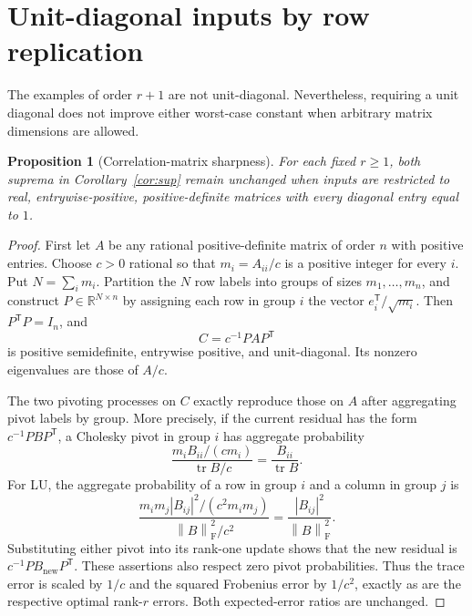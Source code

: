 \documentclass[11pt]{article}
\newtheorem{proposition}[theorem]{Proposition}
\theoremstyle{remark}
\DeclareMathOperator{\tr}{tr}
\newcommand{\R}{\mathbb R}
\newcommand{\F}{\mathrm F}
\newcommand{\norm}[1]{\left\lVert#1\right\rVert}
\begin{document}
\section{Unit-diagonal inputs by row replication}

The examples of order $r+1$ are not unit-diagonal. Nevertheless, requiring a
unit diagonal does not improve either worst-case constant when arbitrary
matrix dimensions are allowed.

\begin{proposition}[Correlation-matrix sharpness]\label{prop:correlation}
For each fixed $r\ge1$, both suprema in Corollary~\ref{cor:sup} remain unchanged
when inputs are restricted to real, entrywise-positive, positive-definite
matrices with every diagonal entry equal to $1$.
\end{proposition}
\begin{proof}
First let $A$ be any rational positive-definite matrix of order $n$ with
positive entries. Choose $c>0$ rational so that
$m_i=A_{ii}/c$ is a positive integer for every $i$. Put $N=\sum_i m_i$.
Partition the $N$ row labels into groups of sizes $m_1,\ldots,m_n$, and
construct $P\in\R^{N\times n}$ by assigning each row in group $i$ the vector
$e_i^{\mathsf T}/\sqrt{m_i}$. Then $P^{\mathsf T}P=I_n$, and
\[
 C=c^{-1}PAP^{\mathsf T}
\]
is positive semidefinite, entrywise positive, and unit-diagonal. Its nonzero
eigenvalues are those of $A/c$.

The two pivoting processes on $C$ exactly reproduce those on $A$ after
aggregating pivot labels by group. More precisely, if the current residual
has the form $c^{-1}PBP^{\mathsf T}$, a Cholesky pivot in group $i$ has
aggregate probability
\[
 \frac{m_i B_{ii}/(cm_i)}{\tr B/c}=\frac{B_{ii}}{\tr B}.
\]
For LU, the aggregate probability of a row in group $i$ and a column in
group $j$ is
\[
 \frac{m_i m_j |B_{ij}|^2/(c^2m_i m_j)}{\norm B_{\F}^2/c^2}
 =\frac{|B_{ij}|^2}{\norm B_{\F}^2}.
\]
Substituting either pivot into its rank-one update shows that the new
residual is $c^{-1}P B_{\mathrm{new}}P^{\mathsf T}$. These assertions also
respect zero pivot probabilities. Thus the trace error is scaled by $1/c$
and the squared Frobenius error by $1/c^2$, exactly as are the respective
optimal rank-$r$ errors. Both expected-error ratios are unchanged.


\end{proof}
\end{document}
